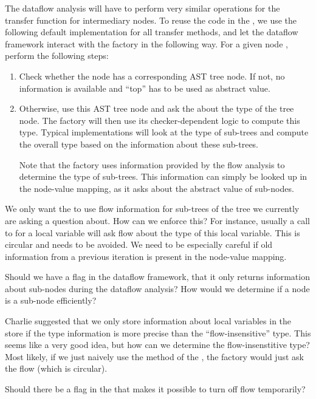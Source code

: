 The dataflow analysis will have to perform very similar operations for the transfer function
for intermediary nodes.  To reuse the code in the , we
use the following default implementation for all transfer methods, and let
the dataflow framework interact with the factory in the following way.
For a given node , perform the following steps:
\begin{enumerate}
    \item Check whether the node has a corresponding AST tree node. If not, no information is
    available and ``top'' has to be used as abstract value.
    \item Otherwise, use this AST tree node and ask the  about
    the type of the tree node.  The factory will then use its checker-dependent logic
    to compute this type.  Typical implementations will look at the type
    of sub-trees and compute the overall type based on the information about these sub-trees.
    
    Note that the factory uses information provided by the flow analysis to determine
    the type of sub-trees.  This information can simply be looked up in the node-value
    mapping, as it asks about the abstract value of sub-nodes.
\end{enumerate}

\begin{workinprogress}
    We only want the  to use flow information for sub-trees of
    the tree we currently are asking a question about.  How can we enforce this?
    For instance, usually a call to  for a local variable will ask flow
    about the type of this local variable.  This is circular and needs to be avoided.
    We need to be especially careful if old information from a previous iteration is present
    in the node-value mapping.
    
    Should we have a flag in the dataflow framework, that it only returns information
    about sub-nodes during the dataflow analysis?  How would we determine if a node is
    a sub-node efficiently?
\end{workinprogress}

\begin{workinprogress}
    Charlie suggested that we only store information about local variables in the store if
    the type information is more precise than the ``flow-insensitive'' type.  This seems like
    a very good idea, but how can we determine the flow-insenstitive type?  Most likely, if we
    just naively use the  method of the , the
    factory would just ask the flow (which is circular).
    
    Should there be a flag in the  that makes it possible to turn off
    flow temporarily?
\end{workinprogress}




